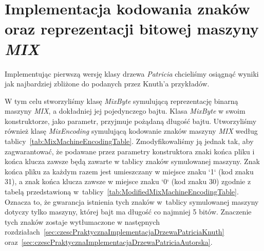 	    \section{Implementacja kodowania znaków oraz reprezentacji bitowej maszyny \emph{MIX}}\label{sec:czescPraktycznaImplementacjaMIX}
	    
	    Implementując pierwszą wersję klasy drzewa \emph{Patricia} chcieliśmy osiągnąć wyniki jak najbardziej zbliżone do podanych przez Knuth'a przykładów. 
	    
	    W tym celu stworzyliśmy klasę \emph{MixByte} symulującą reprezentację binarną maszyny \emph{MIX}, a dokładniej jej pojedynczego bajtu. Klasa \emph{MixByte} w swoim konstruktorze, jako parametr, przyjmuje pożądaną długość bajtu. Utworzyliśmy również klasę \emph{MixEncoding} symulującą kodowanie znaków maszyny \emph{MIX} według tablicy~\ref{tab:MixMachineEncodingTable}. Zmodyfikowaliśmy ją jednak tak, aby zagwarantować, że podawane przez parametry konstruktora znaki końca pliku i końca klucza zawsze będą zawarte w tablicy znaków symulowanej maszyny. Znak końca pliku za każdym razem jest umieszczany w miejsce znaku `1` (kod znaku 31), a znak końca klucza zawsze w miejsce znaku `0` (kod znaku 30) zgodnie z tabelą przedstawioną w~tablicy~\ref{tab:ModifiedMixMachineEncodingTable}. Oznacza to, że gwarancja istnienia tych znaków w~tablicy symulowanej maszyny dotyczy tylko maszyny, której bajt ma długość co najmniej 5 bitów. Znaczenie tych znaków zostaje wytłumaczone w następnych rozdziałach~\ref{sec:czescPraktycznaImplementacjaDrzewaPatriciaKnuth} oraz~\ref{sec:czescPraktycznaImplementacjaDrzewaPatriciaAutorska}.
	    
